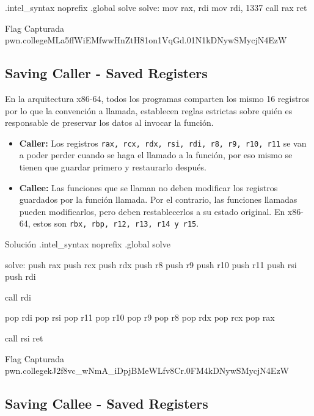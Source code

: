 \begin{codebox}[ASM]{}
	.intel_syntax noprefix
	.global solve
	solve:
	mov rax, rdi
	mov rdi, 1337
	call rax
	ret
\end{codebox}

\begin{flagbox}{Flag Capturada}
	pwn.college{MLa5ffWiEMfwwHnZtH81on1VqGd.01N1kDNywSMycjN4EzW}
\end{flagbox}

\subsection{Saving Caller - Saved Registers} \label{subsec:saving_caller_saved_registers}

En la arquitectura x86-64, todos los programas comparten los mismo 16 registros
por lo que la convención a llamada, establecen reglas estrictas sobre quién es
responsable de preservar los datos al invocar la función.

\begin{itemize}
	\item \textbf{Caller:} Los registros \texttt{rax, rcx, rdx, rsi, rdi, r8, r9, r10, r11}
	      se van a poder perder cuando se haga el llamado a la función, por eso mismo se tienen
	      que guardar primero y restaurarlo después.

	\item \textbf{Callee: }Las funciones que se llaman no deben modificar los
	      registros guardados por la función llamada. Por el contrario, las funciones
	      llamadas pueden modificarlos, pero deben restablecerlos a su estado original.
	      En x86-64, estos son \texttt{rbx, rbp, r12, r13, r14 y r15}.
\end{itemize}
\begin{codebox}[ASM]{Solución}
	.intel_syntax noprefix
	.global solve

	solve:
	push rax
	push rcx
	push rdx
	push r8
	push r9
	push r10
	push r11
	push rsi
	push rdi

	call rdi

	pop rdi
	pop rsi
	pop r11
	pop r10
	pop r9
	pop r8
	pop rdx
	pop rcx
	pop rax

	call rsi
	ret
\end{codebox}
\begin{flagbox}{Flag Capturada}
	pwn.college{kJ2f8vc_wNmA_iDpjBMeWLfv8Cr.0FM4kDNywSMycjN4EzW}
\end{flagbox}

\subsection{Saving Callee - Saved Registers} \label{subsec:saving_callee_saved_registers}

